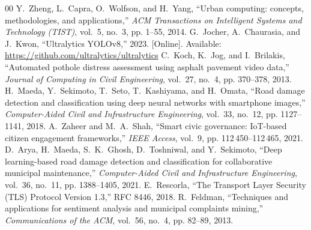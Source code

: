 \documentclass[conference]{IEEEtran}
\begin{document}

\begin{thebibliography}{00}
 Y.~Zheng, L.~Capra, O.~Wolfson, and H.~Yang, ``Urban computing: concepts, methodologies, and applications,'' \emph{ACM Transactions on Intelligent Systems and Technology (TIST)}, vol.~5, no.~3, pp. 1--55, 2014.
 G.~Jocher, A.~Chaurasia, and J.~Kwon, ``Ultralytics YOLOv8,'' 2023. [Online]. Available: \url{https://github.com/ultralytics/ultralytics}
 C.~Koch, K.~Jog, and I.~Brilakis, ``Automated pothole distress assessment using asphalt pavement video data,'' \emph{Journal of Computing in Civil Engineering}, vol.~27, no.~4, pp. 370--378, 2013.
 H.~Maeda, Y.~Sekimoto, T.~Seto, T.~Kashiyama, and H.~Omata, ``Road damage detection and classification using deep neural networks with smartphone images,'' \emph{Computer-Aided Civil and Infrastructure Engineering}, vol.~33, no.~12, pp. 1127--1141, 2018.
 A.~Zaheer and M.~A.~Shah, ``Smart civic governance: IoT-based citizen engagement frameworks,'' \emph{IEEE Access}, vol.~9, pp. 112\,450--112\,465, 2021.
 D.~Arya, H.~Maeda, S.~K.~Ghosh, D.~Toshniwal, and Y.~Sekimoto, ``Deep learning-based road damage detection and classification for collaborative municipal maintenance,'' \emph{Computer-Aided Civil and Infrastructure Engineering}, vol.~36, no.~11, pp. 1388--1405, 2021.
 E.~Rescorla, ``The Transport Layer Security (TLS) Protocol Version 1.3,'' RFC 8446, 2018.
 R.~Feldman, ``Techniques and applications for sentiment analysis and municipal complaints mining,'' \emph{Communications of the ACM}, vol.~56, no.~4, pp. 82--89, 2013.
\end{thebibliography}
\end{document}
